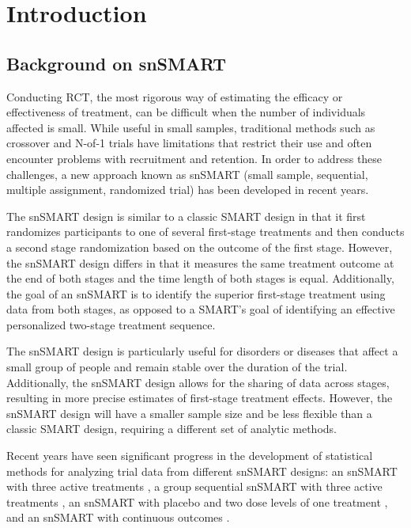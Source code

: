 \chapter{Introduction}
\label{chpt:introduction}

\section{Background on snSMART}
Conducting \ac{RCT}, the most rigorous way of
estimating the efficacy or effectiveness of treatment, can be difficult when the number of individuals affected is small. While useful in small samples, traditional methods such as crossover and N-of-1 trials have limitations that restrict their use and often encounter problems with recruitment and retention. In order to address these challenges, a new approach known as \ac{snSMART} (small sample, sequential, multiple assignment, randomized trial) has been developed in recent years.

The \ac{snSMART} design is similar to a classic \ac{SMART} design in that it first randomizes participants to one of several first-stage treatments and then conducts a second stage randomization based on the outcome of the first stage. However, the \ac{snSMART} design differs in that it measures the same treatment outcome at the end of both stages and the time length of both stages is equal. Additionally, the goal of an \ac{snSMART} is to identify the superior first-stage treatment using data from both stages, as opposed to a SMART's goal of identifying an effective personalized two-stage treatment sequence.

The \ac{snSMART} design is particularly useful for disorders or diseases that affect a small group of people and remain stable over the duration of the trial. Additionally, the \ac{snSMART} design allows for the sharing of data across stages, resulting in more precise estimates of first-stage treatment effects. However, the \ac{snSMART} design will have a smaller sample size and be less flexible than a classic SMART design, requiring a different set of analytic methods.

Recent years have seen significant progress in the development of statistical methods for analyzing trial data from different \ac{snSMART} designs: an \ac{snSMART} with three active treatments \citep{wei2018bayesian, wei2020sample, chao2020dynamic}, a group sequential \ac{snSMART} with three active treatments \citep{chao2020bayesian}, an \ac{snSMART} with placebo and two dose levels of one treatment \citep{fang2021bayesian, fang2023comparing}, and an \ac{snSMART} with continuous outcomes \citep{hartman2021design}.

